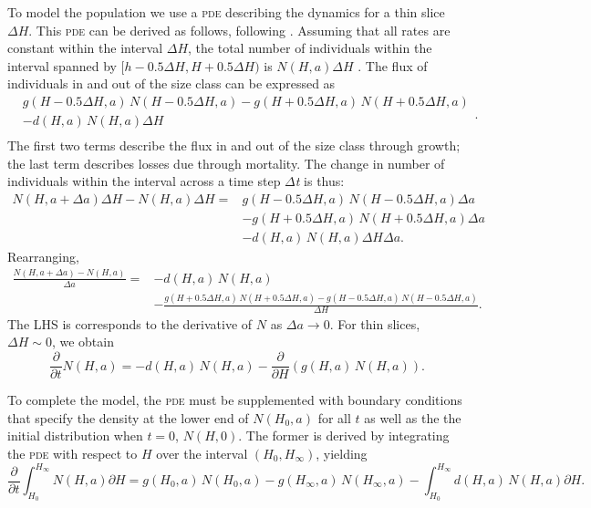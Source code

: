 \documentclass[10pt,twoside]{article}
\begin{document}
To model the population we use a \textsc{pde} describing the dynamics for a thin
slice \(\Delta H\). This \textsc{pde} can be derived as follows, following
\citet{Deroos-1997}. Assuming that all rates are constant within the
interval \(\Delta H\), the total number of individuals within the
interval spanned by \([h - 0.5\Delta H, H + 0.5\Delta H)\) is
\(N(H, a)\Delta H\) . The flux of individuals in and out of the size
class can be expressed as
\begin{equation}\begin{array}{ll} &g(H - 0.5 \Delta H, a) \, N(H - 0.5 \Delta H, a) - g(H + 0.5 \Delta H, a) \, N(H + 0.5 \Delta H, a) \\ & - d (H, a) \, N(H, a)\Delta H\\ \end{array}.
\end{equation}
The first two terms describe the flux in and out of the size class
through growth; the last term describes losses due through mortality.
The change in number of individuals within the interval across a time
step \textit{$\Delta $t} is thus:
\begin{equation}
  \begin{array}{ll} N(H, a + \Delta a)\Delta H - N(H, a)\Delta H = &g(H - 0.5 \Delta H, a) \, N(H - 0.5 \Delta H, a)\Delta a \\ & - g(H + 0.5 \Delta H, a) \, N(H + 0.5 \Delta H, a)\Delta a\\& - d (H, a) \, N(H, a)\Delta H\Delta a.
  \end{array}
\end{equation}
Rearranging,
\begin{equation}
  \begin{array}{ll}
  \frac{N(H, a + \Delta a) - N(H, a)}{\Delta a} = & - d (H, a) \, N(H, a) \\
  & - \frac{g(H + 0.5 \Delta H, a) \, N(H + 0.5 \Delta H, a) - g(H - 0.5 \Delta H, a) \, N(H - 0.5 \Delta H, a)}{\Delta H}.
  \end{array}
\end{equation}
The LHS is corresponds to the derivative of \(N\) as \(\Delta a\to 0\).
For thin slices, \(\Delta H \sim 0\), we obtain
\begin{equation} \label{eq:PDE-app}
  \frac{\partial}{\partial t} N(H, a) = - d (H, a) \, N(H, a) - \frac{\partial}{\partial H} (g(H, a) \, N(H, a)).
\end{equation}

To complete the model, the \textsc{pde} must be supplemented with boundary
conditions that specify the density at the lower end of \(N(H_{0}, a)\)
for all \(t\) as well as the the initial distribution when \(t = 0\),
\(N(H,0)\). The former is derived by integrating the \textsc{pde} with respect to
\(H\) over the interval \((H_{0}, H_{\infty} )\), yielding
\begin{equation}\frac{\partial}{\partial t} \int _{H_{0} }^{H_{\infty}}N(H, a) \partial H = g(H_{0} , a) \, N(H_{0} , a) - g(H_{\infty}, a) \, N(H_{\infty}, a) - \int _{H_{0} }^{H_{\infty}}d (H, a) \, N(H, a) \partial H.
\end{equation}
\end{document}
